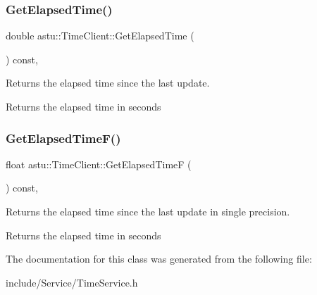 \subsubsection{\texorpdfstring{Get\+Elapsed\+Time()}{GetElapsedTime()}}
{\footnotesize\ttfamily double astu\+::\+Time\+Client\+::\+Get\+Elapsed\+Time (\begin{DoxyParamCaption}{ }\end{DoxyParamCaption}) const\hspace{0.3cm}{\ttfamily [inline]}, {\ttfamily [protected]}}

Returns the elapsed time since the last update.

\begin{DoxyReturn}{Returns}
the elapsed time in seconds 
\end{DoxyReturn}
\mbox{\label{classastu_1_1TimeClient_acce492f9b479370a552e7a982019a6ca}} 
\subsubsection{\texorpdfstring{Get\+Elapsed\+Time\+F()}{GetElapsedTimeF()}}
{\footnotesize\ttfamily float astu\+::\+Time\+Client\+::\+Get\+Elapsed\+TimeF (\begin{DoxyParamCaption}{ }\end{DoxyParamCaption}) const\hspace{0.3cm}{\ttfamily [inline]}, {\ttfamily [protected]}}

Returns the elapsed time since the last update in single precision.

\begin{DoxyReturn}{Returns}
the elapsed time in seconds 
\end{DoxyReturn}


The documentation for this class was generated from the following file\+:\begin{DoxyCompactItemize}
\item 
include/\+Service/Time\+Service.\+h\end{DoxyCompactItemize}
